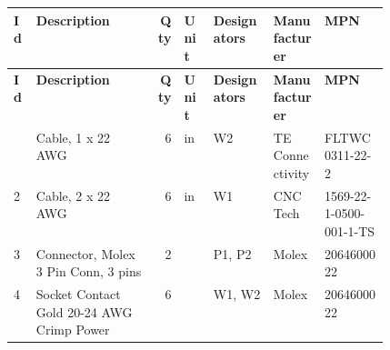 \begingroup\small\setlength{\tabcolsep}{5pt}
\begin{longtable}{@{}l >{\raggedright\arraybackslash}p{0.32\linewidth} r l >{\raggedright\arraybackslash}p{0.16\linewidth} l l@{}}
\toprule
\textbf{Id} & \textbf{Description} & \textbf{Qty} & \textbf{Unit} & \textbf{Designators} & \textbf{Manufacturer} & \textbf{MPN} \\
\midrule
\endfirsthead
\toprule
\textbf{Id} & \textbf{Description} & \textbf{Qty} & \textbf{Unit} & \textbf{Designators} & \textbf{Manufacturer} & \textbf{MPN} \\
\midrule
\endhead
\bottomrule
\endfoot
1 & Cable, 1 x 22 AWG & 6 & in & W2 & TE Connectivity & FLTWC0311-22-2 \\
2 & Cable, 2 x 22 AWG & 6 & in & W1 & CNC Tech & 1569-22-1-0500-001-1-TS \\
3 & Connector, Molex 3 Pin Conn, 3 pins & 2 &  & P1, P2 & Molex & 2064600022 \\
4 & Socket Contact Gold 20-24 AWG Crimp Power & 6 &  & W1, W2 & Molex & 2064600022 \\
\end{longtable}\endgroup
